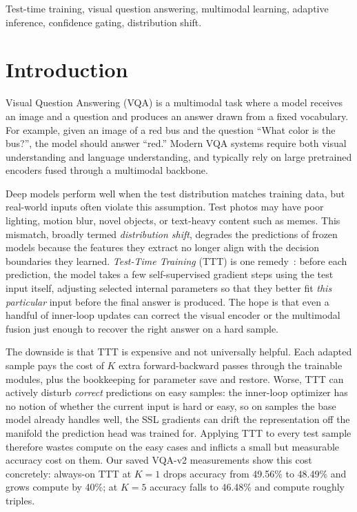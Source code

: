 \documentclass[conference]{IEEEtran}
\begin{document}
\begin{IEEEkeywords}
Test-time training, visual question answering, multimodal learning,
adaptive inference, confidence gating, distribution shift.
\end{IEEEkeywords}

\section{Introduction}

Visual Question Answering (VQA) is a multimodal task where a model receives
an image and a question and produces an answer drawn from a fixed
vocabulary. For example, given an image of a red bus and the question
``What color is the bus?'', the model should answer ``red.'' Modern VQA
systems require both visual understanding and language understanding, and
typically rely on large pretrained encoders fused through a multimodal
backbone.

Deep models perform well when the test distribution matches training data,
but real-world inputs often violate this assumption. Test photos may have
poor lighting, motion blur, novel objects, or text-heavy content such as
memes. This mismatch, broadly termed \emph{distribution shift}, degrades
the predictions of frozen models because the features they extract no
longer align with the decision boundaries they learned. \emph{Test-Time
Training} (TTT) is one remedy~\cite{b6}: before each prediction, the model
takes a few self-supervised gradient steps using the test input itself,
adjusting selected internal parameters so that they better fit \emph{this
particular} input before the final answer is produced. The hope is that
even a handful of inner-loop updates can correct the visual encoder or
the multimodal fusion just enough to recover the right answer on a
hard sample.

The downside is that TTT is expensive and not universally helpful. Each
adapted sample pays the cost of $K$ extra forward-backward passes through
the trainable modules, plus the bookkeeping for parameter save and
restore. Worse, TTT can actively disturb \emph{correct} predictions on
easy samples: the inner-loop optimizer has no notion of whether the
current input is hard or easy, so on samples the base model already
handles well, the SSL gradients can drift the representation off the
manifold the prediction head was trained for. Applying TTT to every
test sample therefore wastes compute on the easy cases and inflicts a
small but measurable accuracy cost on them. Our saved VQA-v2 measurements
show this cost concretely: always-on TTT at $K{=}1$ drops accuracy from
49.56\% to 48.49\% and grows compute by 40\%; at $K{=}5$ accuracy falls
to 46.48\% and compute roughly triples.
\end{document}
